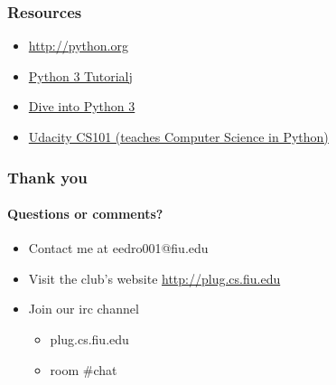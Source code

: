 \documentclass{beamer}
\begin{document}
\begin{frame}
  \frametitle{Resources}
  \begin{itemize}
    \item \url{http://python.org}
    \item \href{http://docs.python.org/3/tutorial/index.html}{Python 3 Tutorial}j
    \item \href{http://www.diveinto.org/python3/}{Dive into Python 3}
    \item \href{https://www.udacity.com/course/cs101}{Udacity CS101 (teaches Computer Science in Python)}
  \end{itemize}
\end{frame}
\begin{frame}
  \frametitle{Thank you}
  \framesubtitle{Questions or comments?}
  \begin{itemize}
    \item Contact me at eedro001@fiu.edu
    \item Visit the club's website \url{http://plug.cs.fiu.edu}
    \item Join our irc channel
      \begin{itemize}
        \item plug.cs.fiu.edu
        \item room \#chat
      \end{itemize}
  \end{itemize}
\end{frame}
\end{document}
